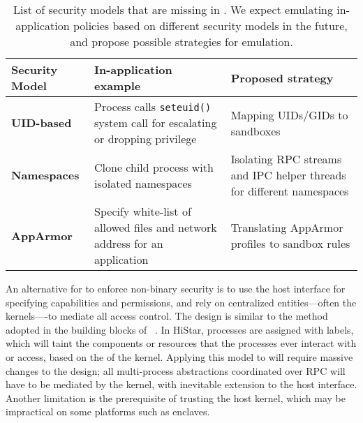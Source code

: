 \begin{table}[t]
\footnotesize
\centering
\begin{tabular}{>{\bf}p{1.2in}>{\raggedright\arraybackslash}p{2.4in}>{\raggedright\arraybackslash}p{2.4in}}
\toprule
{\bf Security Model} & {\bf In-application example} & {\bf Proposed strategy} \\
\midrule
UID-based & Process calls {\tt seteuid()} system call for escalating or dropping privilege & Mapping UIDs/GIDs to sandboxes \\
\midrule
Namespaces & Clone child process with isolated namespaces & Isolating RPC streams and IPC helper threads for different namespaces \\
\midrule
AppArmor & Specify white-list of allowed files and network address for an application & Translating AppArmor profiles to sandbox rules \\
\bottomrule
\end{tabular}
\caption[List of security models to be added in \graphene{} as future works]
{List of security models that are missing in \graphene{}.
We expect emulating in-application policies based on different security models in the future, and propose possible strategies for emulation.}
\label{tab:future:security}
\end{table}



An alternative for \picoprocs{} to enforce non-binary security
is to use the host interface
for specifying capabilities and permissions,
and rely on centralized entities---often the kernels----to mediate all 
access control.
The design is similar to the method adopted in the building blocks of ~\citep{zeldovich+histar}.
In HiStar, processes are assigned with labels, which will taint the components or resources that the processes ever interact with or access,
based on the  of the kernel.
Applying this model to \graphene{} will require
massive changes to the design;
all multi-process abstractions coordinated over RPC will have to be mediated by the kernel, with inevitable extension to the host interface.
Another limitation is the prerequisite of
trusting the host kernel,
which may be impractical on some platforms such as \sgx{} enclaves.

